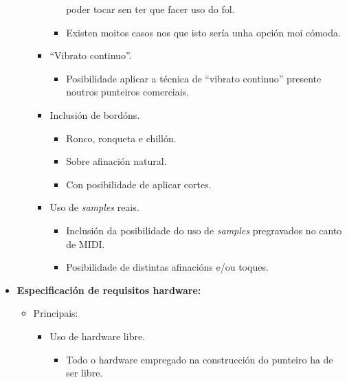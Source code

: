 \begin{itemize}
\begin{itemize}
\begin{itemize}
\begin{itemize}
                              poder tocar sen ter que facer uso do fol.
                        \item Existen moitos casos nos que isto sería unha
                              opción moi cómoda.
                       \end{itemize}
                 \item ``Vibrato continuo''.
                       \begin{itemize}
                        \item Posibilidade aplicar a técnica de
                              ``vibrato continuo'' presente noutros punteiros
                              comerciais.
                       \end{itemize}
                 \item Inclusión de bordóns.
                       \begin{itemize}
                        \item Ronco, ronqueta e chillón.
                        \item Sobre afinación natural.
                        \item Con posibilidade de aplicar cortes.
                       \end{itemize}
                 \item Uso de \textit{samples} reais.
                       \begin{itemize}
                        \item Inclusión da posibilidade do uso de
                              \textit{samples} pregravados no canto de MIDI.
                        \item Posibilidade de distintas afinacións e/ou toques.
                       \end{itemize}
                \end{itemize}
         \end{itemize}
   \item \textbf{Especificación de requisitos hardware:}
         \begin{itemize}
          \item Principais:
                \begin{itemize}
                 \item Uso de hardware libre.
                       \begin{itemize}
                        \item Todo o hardware empregado na construcción do
                              punteiro ha de ser libre.

\end{itemize}
\end{itemize}
\end{itemize}
\end{itemize}
